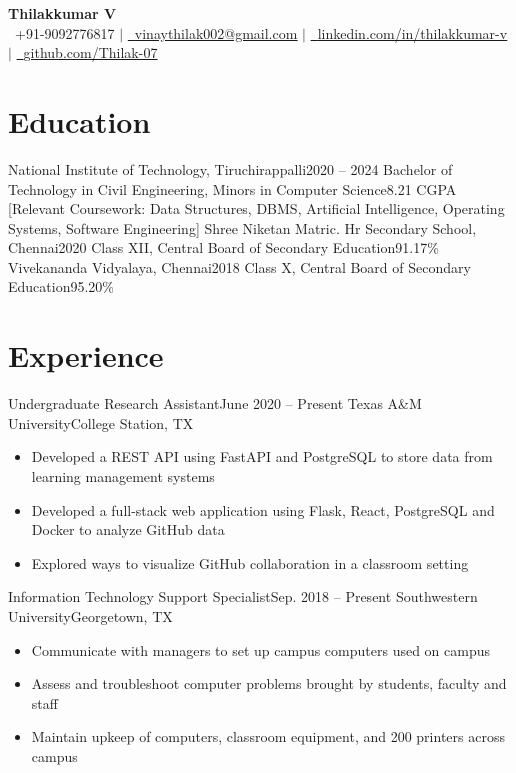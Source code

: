 \documentclass[letterpaper,11pt]{article}
\newcommand{\resumeItem}[1]{
  \item\small{
    {#1 \vspace{-2pt}}
  }
}
\newcommand{\resumeSubHeadingListStart}{\begin{itemize}[leftmargin=0.15in, label={}]}
\newcommand{\resumeSubHeadingListEnd}{\end{itemize}}
\newcommand{\resumeItemListStart}{\begin{itemize}}
\newcommand{\resumeItemListEnd}{\end{itemize}\vspace{-5pt}}
\begin{document}
\begin{center}
    \textbf{\Huge Thilakkumar V} \\ \vspace{2pt}
    {\raisebox{0.0\height}{\footnotesize \faPhone}\
    \footnotesize +91-9092776817} $|$
    \href{mailto:vinaythilak002@gmail.com}
    {\raisebox{-0.1\height}{\footnotesize \faEnvelope}\
    \footnotesize \underline{vinaythilak002@gmail.com}} $|$ 
    \href{https://www.linkedin.com/in/thilakkumar-v-65610a200/}
    {\raisebox{-0.1\height}{\footnotesize \faLinkedin}\
    \footnotesize \underline{linkedin.com/in/thilakkumar-v}} $|$
    \href{https://github.com/Thilak-07}
    {\raisebox{-0.1\height}{\footnotesize \faGithub}\
    \footnotesize \underline{github.com/Thilak-07}}
\end{center}


\section{Education}
  \resumeSubHeadingListStart
    \resumeSubheading
      {National Institute of Technology, Tiruchirappalli}{2020 -- 2024}
      {Bachelor of Technology in Civil Engineering, Minors in Computer Science}{8.21 CGPA}
      [Relevant Coursework: Data Structures, DBMS, Artificial Intelligence, Operating Systems, Software Engineering]
    \resumeSubheading
      {Shree Niketan Matric. Hr Secondary School, Chennai}{2020}
      {Class XII, Central Board of Secondary Education}{91.17\%}
    \resumeSubheading
      {Vivekananda Vidyalaya, Chennai}{2018}
      {Class X, Central Board of Secondary Education}{95.20\%}
  \resumeSubHeadingListEnd


\section{Experience}
  \resumeSubHeadingListStart
    \resumeSubheading
      {Undergraduate Research Assistant}{June 2020 -- Present}
      {Texas A\&M University}{College Station, TX}
      \resumeItemListStart
        \resumeItem{Developed a REST API using FastAPI and PostgreSQL to store data from learning management systems}
        \resumeItem{Developed a full-stack web application using Flask, React, PostgreSQL and Docker to analyze GitHub data}
        \resumeItem{Explored ways to visualize GitHub collaboration in a classroom setting}
      \resumeItemListEnd

    \resumeSubheading
      {Information Technology Support Specialist}{Sep. 2018 -- Present}
      {Southwestern University}{Georgetown, TX}
      \resumeItemListStart
        \resumeItem{Communicate with managers to set up campus computers used on campus}
        \resumeItem{Assess and troubleshoot computer problems brought by students, faculty and staff}
        \resumeItem{Maintain upkeep of computers, classroom equipment, and 200 printers across campus}
    \resumeItemListEnd
  \resumeSubHeadingListEnd
\end{document}
